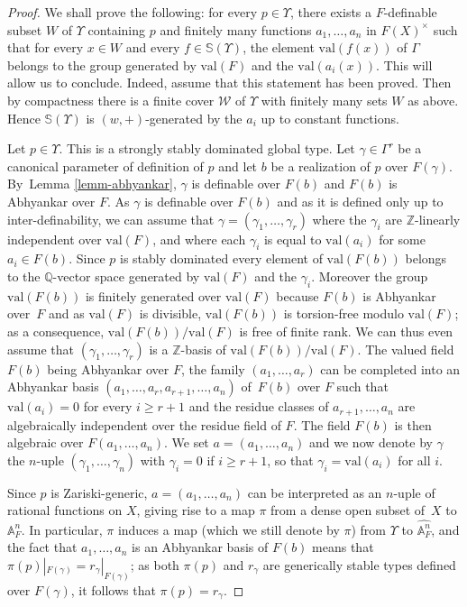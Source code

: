 \documentclass[JEP,XML,SOM,Unicode,ThmDefs,NoEqCountersInSection,published]{cedram}
\newcommand{\val}{\mathrm{val}}
\newcommand{\bA}{\mathbb A}
\newcommand{\Q}{\mathbb Q}
\newcommand{\Z}{\mathbb Z}
\renewcommand{\SS}{\mathbb S}
\theoremstyle{plain}
\theoremstyle{definition}
\begin{document}
\begin{proof}
We shall prove the following: for every $p\in \Upsilon$, there exists a $F$-definable subset $W$ of $\Upsilon$
containing $p$ and finitely many functions $a_1,\ldots, a_n$
in $F(X)^\times$
such that for every $x\in W$ and every $f\in \SS(\Upsilon)$, the element $\val(f(x))$ of $\Gamma$
belongs to the group generated by $\val(F)$ and the $\val(a_i(x))$. This will allow us to conclude.
Indeed, assume that this statement has been proved. Then by compactness there is a finite
cover $\mathscr W$ of $\Upsilon$
with finitely many sets $W$ as above. Hence
$\SS(\Upsilon)$ is $(w,+)$-generated by the $a_i$ up to
constant functions.

Let $p\in \Upsilon$. This is a strongly stably dominated global type.
Let $\gamma \in \Gamma^r$ be a canonical parameter of definition
of $p$ and let $b$ be a realization of $p$
over $F(\gamma)$. By~Lemma \ref{lemm-abhyankar}, $\gamma$ is definable over $F(b)$ and $F(b)$
is Abhyankar over $F$. As $\gamma$ is definable over $F(b)$ and
as it is defined only up to inter-definability, we can assume that
$\gamma=(\gamma_1,\ldots, \gamma_r)$
where the $\gamma_i$ are $\Z$-linearly independent over
$\val(F)$, and where each $\gamma_i$ is equal to $\val(a_i)$
for some $a_i\in F(b)$. Since $p$ is stably dominated every element of
$\val(F(b))$ belongs to the $\Q$-vector space generated by $\val (F)$
and the $\gamma_i$. Moreover the group
$\val (F(b))$ is finitely generated over
$\val(F)$ because $F(b)$ is Abhyankar over~$F$
and as $\val(F)$ is divisible, $\val( F(b))$ is torsion-free
modulo $\val (F)$; as a consequence, $\val(F(b))/\val(F)$ is free of finite rank. We can thus
even assume that $(\gamma_1,\ldots, \gamma_r)$ is a $\Z$-basis
of $\val(F(b))/\val(F)$.
The valued field $F(b)$ being
Abhyankar over $F$, the family $(a_1,\ldots, a_r)$ can be completed into
an Abhyankar basis $(a_1,\ldots, a_r, a_{r+1},\ldots, a_n)$ of~$F(b)$ over $F$
such that $\val(a_i)=0$ for every $i\geq r+1$ and the residue classes of $a_{r+1},\dots,a_n$ are
algebraically independent over the residue field of $F$.
The field $F(b)$ is then algebraic over $F(a_1,\ldots, a_n)$.
We set $a=(a_1,\ldots,a_n)$ and we now denote by $\gamma$
the $n$-uple $(\gamma_1,\ldots, \gamma_n)$ with $\gamma_i=0$ if
$i\geq r+1$, so that $\gamma_i=\val(a_i)$
for all $i$.

Since $p$ is Zariski-generic, $a=(a_1,\ldots, a_n)$ can be interpreted as an $n$-uple of rational functions on $X$, giving rise to a map $\pi$ from a dense
open subset of~$X$ to $\bA^n_F$. In particular, $\pi$ induces a map (which we still denote by $\pi$) from $\Upsilon$
to $\widehat{\bA^n_F}$, and the fact that $a_1,\ldots, a_n$
is an Abhyankar basis of $F(b)$ means that $\pi(p)|_{F(\gamma)}=r_{\gamma}|_{F(\gamma)}$;
as both $\pi(p)$ and $r_\gamma$ are generically stable types defined over $F(\gamma)$, it follows that $\pi(p)=r_\gamma$.


\end{proof}
\end{document}
